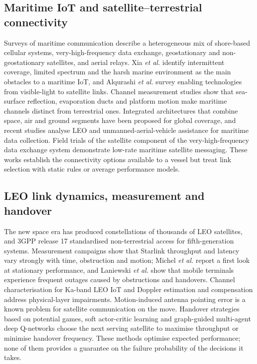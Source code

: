 \subsection{Maritime IoT and satellite--terrestrial connectivity}
Surveys of maritime communication describe a heterogeneous mix of shore-based cellular systems, very-high-frequency data exchange, geostationary and non-geostationary satellites, and aerial relays\cite{alqurashi2023,shang2025,xia2020}. Xia \emph{et al.}\cite{xia2020} identify intermittent coverage, limited spectrum and the harsh marine environment as the main obstacles to a maritime IoT, and Alqurashi \emph{et al.}\cite{alqurashi2023} survey enabling technologies from visible-light to satellite links. Channel measurement studies show that sea-surface reflection, evaporation ducts and platform motion make maritime channels distinct from terrestrial ones\cite{chen2021ch}. Integrated architectures that combine space, air and ground segments have been proposed for global coverage\cite{liu2018,guo2022}, and recent studies analyse LEO and unmanned-aerial-vehicle assistance for maritime data collection\cite{hu2026,nomikos2024}. Field trials of the satellite component of the very-high-frequency data exchange system demonstrate low-rate maritime satellite messaging\cite{gomez2018}. These works establish the connectivity options available to a vessel but treat link selection with static rules or average performance models.

\subsection{LEO link dynamics, measurement and handover}
The new space era has produced constellations of thousands of LEO satellites\cite{kodheli2021}, and 3GPP release 17 standardised non-terrestrial access for fifth-generation systems\cite{lin2021}. Measurement campaigns show that Starlink throughput and latency vary strongly with time, obstruction and motion; Michel \emph{et al.}\cite{michel2022} report a first look at stationary performance, and Laniewski \emph{et al.}\cite{laniewski2024} show that mobile terminals experience frequent outages caused by obstructions and handovers. Channel characterisation for Ka-band LEO IoT\cite{zhu2022} and Doppler estimation and compensation\cite{pan2020} address physical-layer impairments. Motion-induced antenna pointing error is a known problem for satellite communication on the move\cite{weerackody2006}. Handover strategies based on potential games\cite{wu2019}, soft actor-critic learning\cite{chen2024ho} and graph-guided multi-agent deep Q-networks\cite{chen2026sr} choose the next serving satellite to maximise throughput or minimise handover frequency. These methods optimise expected performance; none of them provides a guarantee on the failure probability of the decisions it takes.

